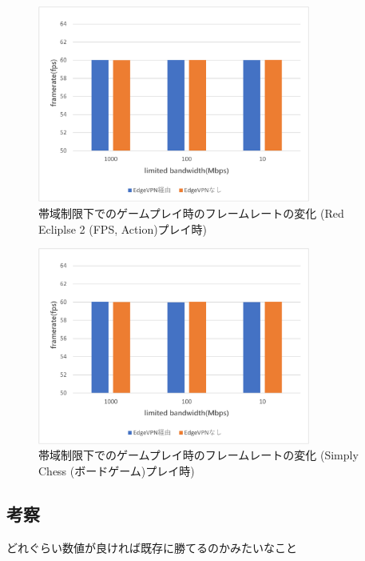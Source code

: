 \begin{figure}[t]
    \centering
    \includegraphics[width=0.8\textwidth,keepaspectratio,clip]{img/framerate_FPS.pdf}
    \caption{帯域制限下でのゲームプレイ時のフレームレートの変化 (Red Ecliplse 2 (FPS, Action)プレイ時)}
    \label{fig:fps_fps}
\end{figure}

\begin{figure}[t]
    \centering
    \includegraphics[width=0.8\textwidth,keepaspectratio,clip]{img/framerate_Board.pdf}
    \caption{帯域制限下でのゲームプレイ時のフレームレートの変化 (Simply Chess (ボードゲーム)プレイ時)}
    \label{fig:fps_board}
\end{figure}

\subsection{考察}
どれぐらい数値が良ければ既存に勝てるのかみたいなこと



